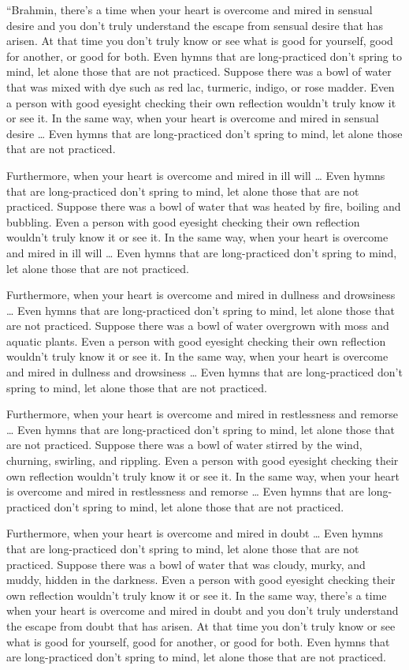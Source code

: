 \documentclass[12pt,openany]{book}%
\begin{document}
“Brahmin, there’s a time when your heart is overcome and mired in sensual desire and you don’t truly understand the escape from sensual desire that has arisen. At that time you don’t truly know or see what is good for yourself, good for another, or good for both. Even hymns that are long-practiced don’t spring to mind, let alone those that are not practiced. Suppose there was a bowl of water that was mixed with dye such as red lac, turmeric, indigo, or rose madder. Even a person with good eyesight checking their own reflection wouldn’t truly know it or see it. In the same way, when your heart is overcome and mired in sensual desire … Even hymns that are long-practiced don’t spring to mind, let alone those that are not practiced. 

Furthermore, when your heart is overcome and mired in ill will … Even hymns that are long-practiced don’t spring to mind, let alone those that are not practiced. Suppose there was a bowl of water that was heated by fire, boiling and bubbling. Even a person with good eyesight checking their own reflection wouldn’t truly know it or see it. In the same way, when your heart is overcome and mired in ill will … Even hymns that are long-practiced don’t spring to mind, let alone those that are not practiced. 

Furthermore, when your heart is overcome and mired in dullness and drowsiness … Even hymns that are long-practiced don’t spring to mind, let alone those that are not practiced. Suppose there was a bowl of water overgrown with moss and aquatic plants. Even a person with good eyesight checking their own reflection wouldn’t truly know it or see it. In the same way, when your heart is overcome and mired in dullness and drowsiness … Even hymns that are long-practiced don’t spring to mind, let alone those that are not practiced. 

Furthermore, when your heart is overcome and mired in restlessness and remorse … Even hymns that are long-practiced don’t spring to mind, let alone those that are not practiced. Suppose there was a bowl of water stirred by the wind, churning, swirling, and rippling. Even a person with good eyesight checking their own reflection wouldn’t truly know it or see it. In the same way, when your heart is overcome and mired in restlessness and remorse … Even hymns that are long-practiced don’t spring to mind, let alone those that are not practiced. 

Furthermore, when your heart is overcome and mired in doubt … Even hymns that are long-practiced don’t spring to mind, let alone those that are not practiced. Suppose there was a bowl of water that was cloudy, murky, and muddy, hidden in the darkness. Even a person with good eyesight checking their own reflection wouldn’t truly know it or see it. In the same way, there’s a time when your heart is overcome and mired in doubt and you don’t truly understand the escape from doubt that has arisen. At that time you don’t truly know or see what is good for yourself, good for another, or good for both. Even hymns that are long-practiced don’t spring to mind, let alone those that are not practiced. 
\end{document}
